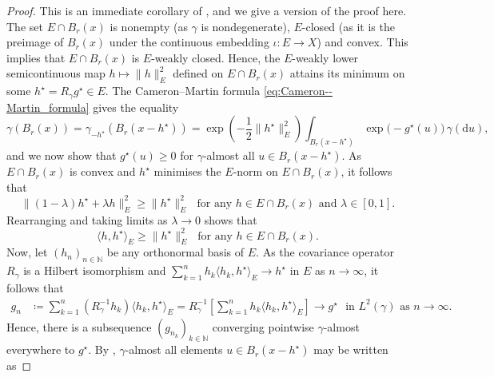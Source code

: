 \documentclass[11pt]{article}
\newcommand*{\cball}[2]{B_{#2}(#1)}
\newcommand*{\defeq}{\coloneqq}
\newcommand*{\Naturals}{\mathbb{N}}
\newcommand*{\rd}{\mathrm{d}}
\renewcommand*{\geq}{\geqslant}
\newcommand*{\crcdfm}[3]{#1(\cball{#2}{#3})}
\theoremstyle{plain}
\theoremstyle{definition}
\newcommand{\norm}[1]{\lVert #1 \rVert}
\numberwithin{equation}{section}
\numberwithin{figure}{section}
\numberwithin{table}{section}
\begin{document}
\begin{proof}
	This is an immediate corollary of \citet[Proposition~11.19]{GhosalVanDerVaart2017}, and we give a version of the proof here.
	The set $E \cap \cball{x}{r}$ is nonempty (as $\gamma$ is nondegenerate), $E$-closed (as it is the preimage of $\cball{x}{r}$ under the continuous embedding $\iota \colon E \to X$) and convex.
	This implies that $E \cap \cball{x}{r}$ is $E$-weakly closed.
	Hence, the $E$-weakly lower semicontinuous map $h \mapsto \|h\|_{E}^{2}$ defined on $E \cap \cball{x}{r}$ attains its minimum on some $h^{\star} = R_\gamma g^{\star} \in E$.
	The Cameron--Martin formula \eqref{eq:Cameron--Martin_formula} gives the equality 
	\begin{equation} \label{eq:Cameron--Martin_bound}
		\crcdfm{\gamma}{x}{r} = \gamma_{-h^{\star}}(\cball{x - h^{\star}}{r}) = \exp\left(-\frac{1}{2}\norm{h^{\star}}_{E}^{2}\right) \int_{\cball{x - h^{\star}}{r}} \exp\bigl(-g^{\star}(u)\bigr) \,\gamma(\rd u),
	\end{equation}
	and we now show that $g^{\star}(u) \geq 0$ for $\gamma$-almost all $u \in \cball{x - h^{\star}}{r}$.
	As $E \cap \cball{x}{r}$ is convex and $h^{\star}$ minimises the $E$-norm on $E \cap \cball{x}{r}$, it follows that
	\begin{equation*}
		\norm{ (1 - \lambda) h^{\star} + \lambda h }_{E}^{2} \geq \norm{ h^{\star} }_{E}^{2} \text{~~for any $h \in E \cap \cball{x}{r}$ and $\lambda \in [0, 1]$.}
	\end{equation*}
	Rearranging and taking limits as $\lambda \to 0$ shows that
	\begin{equation} \label{eq:E-inner_product_bound}
		\langle h, h^{\star}\rangle_{E} \geq \|h^{\star}\|_{E}^{2} \text{~~for any $h \in E \cap \cball{x}{r}$.}
	\end{equation}
	Now, let $(h_n)_{n \in \Naturals}$ be any orthonormal basis of $E$.
	As the covariance operator $R_\gamma$ is a Hilbert isomorphism and $\sum_{k = 1}^n h_k \langle h_k, h^{\star} \rangle_{E} \to h^{\star}$ in $E$ as $n \to \infty$, it follows that
	\begin{align*}
		g_n &\defeq \sum_{k = 1}^n  (R_\gamma^{-1} h_k) \langle h_k, h^{\star} \rangle_{E} = R_\gamma^{-1} \left[ \sum_{k = 1}^n h_k \langle h_k, h^{\star} \rangle_{E} \right] \to g^{\star} \text{~~in $L^{2}(\gamma)$ as $n \to \infty$.}
	\end{align*}
	Hence, there is a subsequence $(g_{n_k})_{k \in \Naturals}$ converging pointwise $\gamma$-almost everywhere to $g^{\star}$.
	By \citet[Theorem~3.5.1]{Bogachev1998}, $\gamma$-almost all elements $u \in \cball{x - h^{\star}}{r}$ may be written as 

\end{proof}
\end{document}
